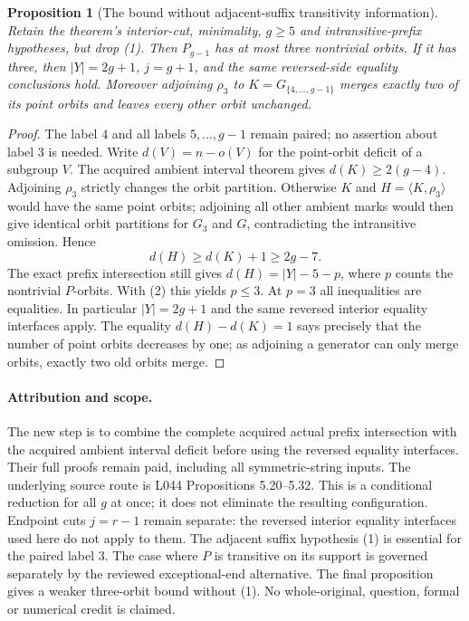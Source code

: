 \documentclass[11pt,a4paper]{article}
\newtheorem{proposition}[theorem]{Proposition}
\newcommand{\gen}[1]{\langle#1\rangle}
\begin{document}
\begin{proposition}[The bound without adjacent-suffix transitivity information]
Retain the theorem's interior-cut, minimality, $g\ge5$ and
intransitive-prefix hypotheses, but drop (1). Then $P_{g-1}$
has at most three nontrivial orbits. If it has three, then
$|Y|=2g+1$, $j=g+1$, and the same reversed-side equality
conclusions hold. Moreover adjoining $\rho_3$ to
$K=G_{\{4,\ldots,g-1\}}$ merges exactly two of its point orbits
and leaves every other orbit unchanged.
\end{proposition}
\begin{proof}
The label $4$ and all labels $5,\ldots,g-1$ remain paired;
no assertion about label $3$ is needed. Write
$d(V)=n-o(V)$ for the point-orbit deficit of a subgroup $V$.
The acquired ambient interval theorem gives
$d(K)\ge2(g-4)$. Adjoining $\rho_3$ strictly changes the
orbit partition. Otherwise $K$ and $H=\gen{K,\rho_3}$
would have the same point orbits; adjoining all other ambient
marks would then give identical orbit partitions for $G_3$
and $G$, contradicting the intransitive omission. Hence
\[
 d(H)\ge d(K)+1\ge2g-7.
\]
The exact prefix intersection still gives $d(H)=|Y|-5-p$,
where $p$ counts the nontrivial $P$-orbits. With (2) this yields
$p\le3$. At $p=3$ all inequalities are equalities. In particular
$|Y|=2g+1$ and the same reversed interior equality interfaces
apply. The equality $d(H)-d(K)=1$ says precisely that the number
of point orbits decreases by one; as adjoining a generator can
only merge orbits, exactly two old orbits merge.
\end{proof}

\paragraph{Attribution and scope.}
The new step is to combine the complete acquired actual prefix
intersection with the acquired ambient interval deficit before
using the reversed equality interfaces. Their full proofs remain
paid, including all symmetric-string inputs. The underlying source
route is L044 Propositions 5.20--5.32. This is a conditional
reduction for all $g$ at once; it does not eliminate the resulting
configuration. Endpoint cuts $j=r-1$ remain separate: the reversed interior
equality interfaces used here do not apply to them.
The adjacent suffix hypothesis (1) is essential
for the paired label $3$. The case where $P$ is transitive on
its support is governed separately by the reviewed exceptional-end
alternative. The final proposition gives a weaker three-orbit bound without (1).
No whole-original, question, formal or numerical credit
is claimed.
\end{document}
